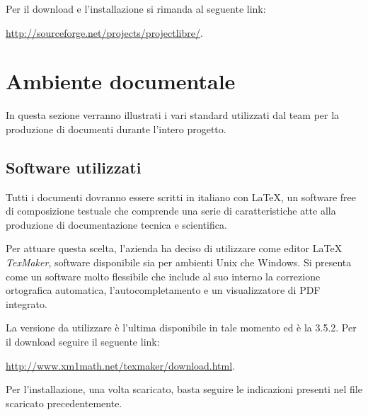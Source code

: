 Per il download e l'installazione si rimanda al seguente link:
\begin{center}
\url{http://sourceforge.net/projects/projectlibre/}.
\end{center}
\clearpage

\section{Ambiente documentale}
\label{sec:ambiente_documentale}
In questa sezione verranno illustrati i vari standard utilizzati dal team per la produzione di documenti durante l'intero progetto. 

\subsection{Software utilizzati}
Tutti i documenti dovranno essere scritti in italiano con \LaTeX, un software free di composizione testuale che comprende una serie di caratteristiche atte alla produzione di documentazione tecnica e scientifica.


Per attuare questa scelta, l'azienda \team{} ha deciso di utilizzare come editor \LaTeX{} \textit{TexMaker}, software disponibile sia per ambienti Unix che Windows. Si presenta come un software molto flessibile che include al suo interno la correzione ortografica automatica, l'autocompletamento e un visualizzatore di PDF integrato.

La versione da utilizzare è l'ultima disponibile in tale momento ed è la 3.5.2. Per il download seguire il seguente link:
\begin{center}
\url{http://www.xm1math.net/texmaker/download.html}.
\end{center}
Per l'installazione, una volta scaricato, basta seguire le indicazioni presenti nel file scaricato precedentemente.

